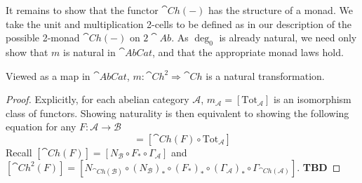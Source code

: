 It remains to show that the functor $\cat{Ch}(-)$ has the structure of a monad. We take the unit and multiplication 2-cells to be defined as in our description of the possible 2-monad $\cat{Ch}(-)$ on $2\cat{Ab}$. As $\deg_0$ is already natural, we need only show that $m$ is natural in $\cat{AbCat}$, and that the appropriate monad laws hold.


\begin{lem}[label=lem:mNat]
    Viewed as a map in $\cat{AbCat}$, $m:\cat{Ch}^2\Rightarrow \cat{Ch}$ is a natural transformation.
\end{lem}
\begin{proof}
    Explicitly, for each abelian category $\mathcal{A}$, $m_\mathcal{A} = [\text{Tot}_\mathcal{A}]$ is an isomorphism class of functors. Showing naturality is then equivalent to showing the following equation for any $F:\mathcal{A}\rightarrow\mathcal{B}$
    \begin{equation*}
        [\text{Tot}_\mathcal{B}\circ \cat{Ch}^2(F)] = [\cat{Ch}(F)\circ\text{Tot}_\mathcal{A}]
    \end{equation*}
    Recall $[\cat{Ch}(F)] = [N_\mathcal{B}\circ F_*\circ \Gamma_\mathcal{A}]$ and $[\cat{Ch}^2(F)] = [N_{\cat{Ch}(\mathcal{B})}\circ (N_\mathcal{B})_*\circ (F_*)_*\circ (\Gamma_\mathcal{A})_*\circ \Gamma_{\cat{Ch}(\mathcal{A})}]$. \textbf{TBD}
\end{proof}


